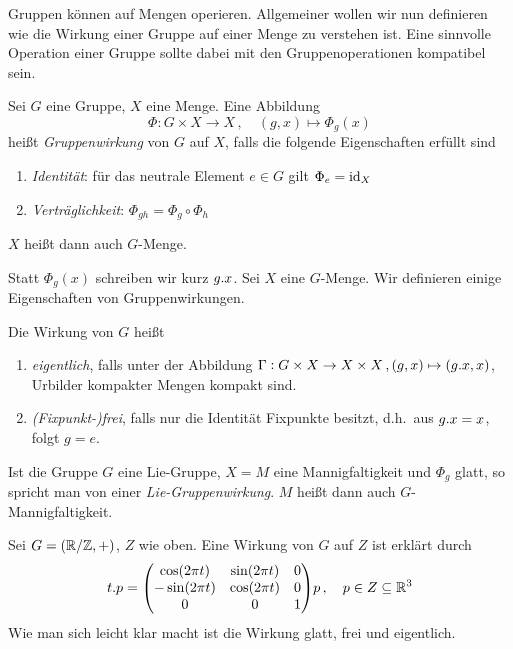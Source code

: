Gruppen können auf Mengen operieren.  
Allgemeiner wollen wir nun definieren wie die Wirkung einer Gruppe auf einer
Menge zu verstehen ist. Eine sinnvolle Operation einer Gruppe sollte dabei mit
den Gruppenoperationen kompatibel sein.
\begin{definition}[Gruppenwirkung]
Sei $G$ eine Gruppe, $X$ eine Menge. Eine Abbildung
\begin{equation}
\Phi:G\times X\to X\,,\quad (g,x)\mapsto\Phi_g(x)
\end{equation}
heißt \emph{Gruppenwirkung} von $G$ auf $X$, falls die folgende Eigenschaften
erfüllt sind
\begin{enumerate}
  \item \emph{Identität}: für das neutrale Element $e\in G$ gilt
  $\displaystyle\Phi_e=\operatorname{id}_X$
  \item \emph{Verträglichkeit}: $\displaystyle\Phi_{gh}=\Phi_g\circ\Phi_h$
\end{enumerate}
$X$ heißt dann auch $G$-Menge.
\end{definition}
Statt $\Phi_g(x)$ schreiben wir kurz $g. x$.
Sei $X$ eine $G$-Menge. Wir definieren einige
Eigenschaften von Gruppenwirkungen.
\begin{definition}
Die Wirkung von $G$ heißt
\begin{enumerate}
  \item \emph{eigentlich}, falls unter der Abbildung $\Gamma:
  G\times X\to X\times X\,,(g,x)\mapsto (g . x,x)$, Urbilder kompakter
  Mengen kompakt sind.
  \item \emph{(Fixpunkt-)frei}, falls nur die Identität Fixpunkte besitzt, d.h.\
  aus $g. x=x$, folgt $g=e$.
\end{enumerate}
Ist die Gruppe $G$ eine Lie-Gruppe, $X=M$ eine Mannigfaltigkeit und $\Phi_g$
glatt, so spricht man von einer \emph{Lie-Gruppenwirkung}. $M$ heißt dann
auch $G$-Mannigfaltigkeit.
\end{definition}
\begin{beispiel}
Sei $G=(\mathbb{R}/\mathbb{Z},+)$, $Z$ wie oben. Eine Wirkung von $G$ auf $Z$ ist
erklärt durch
\begin{equation}
t.p= \begin{pmatrix}
\cos\left( 2\pi t\right)&\sin\left( 2\pi t\right)&0\\
-\sin\left( 2\pi t\right)&\cos\left( 2\pi t\right)&0\\
0&0&1
\end{pmatrix}p\,,\quad p\in Z\subseteq \Reals^3
\end{equation}
Wie man sich leicht klar macht ist die Wirkung glatt, frei und eigentlich.
\end{beispiel}
